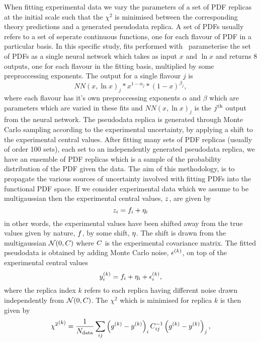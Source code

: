 When fitting experimental data we vary the parameters of a set of PDF replicas
at the initial scale such that the $\chi^2$ is minimised between the
corresponding theory predictions and a generated pseudodata replica. A set of
PDFs usually refers to a set of seperate continuous functions, one for each
flavour of PDF in a particular basis. In this specific study, fits performed
with \nfit\ parameterise the set of PDFs as a single neural network which takes
as input $x$ and $\ln x$ and returns 8 outputs, one for each flavour in the
fitting basis, multiplied by some preproccessing exponents. The output for a
single flavour $j$ is
\begin{equation}
    NN(x, \ln x)_j * x^{1-\alpha_j} * (1-x)^{\beta_j},
\end{equation}
where each flavour has it's own preproccessing exponents $\alpha$ and $\beta$
which are parameters which are varied in these fits and $NN(x, \ln x)_j$ is the
$j^{\rm th}$ output from the neural network. The pseudodata replica is generated
through Monte Carlo sampling according to the experimental uncertainty, by
applying a shift to the experimental
central values. After fitting many sets of PDF replicas (usually of order 100 sets),
each set to an independently generated pseudodata replica, we have an ensemble of
PDF replicas which is a sample of the probability distribution of the PDF given
the data. The aim of this methodology, is to propagate the various sources of
uncertainty involved with fitting PDFs into the functional PDF space. If we
consider experimental data which we assume
to be multigaussian then the experimental central values, $z$, are given by
\begin{equation}
    z_{i} = f_i + \eta_i
\end{equation}
in other words, the experimental values have been shifted away from the true
values given by nature, $f$, by some shift, $\eta$. The shift is drawn from
the multigaussian $\mathcal{N}(0, C)$ where $C$ is the experimental
covariance matrix. The fitted pseudodata is obtained by adding Monte Carlo
noise, $\epsilon^{(k)}$, on top of the experimental central values
\begin{equation}
    y^{(k)}_{i} = f_i + \eta_i + \epsilon^{(k)}_{i},
\end{equation}
where the replica index $k$ refers to each replica having different noise drawn
independently from $\mathcal{N}(0, C)$. The $\chi^2$ which is minimised for
replica $k$ is then given by
\begin{equation}
    {\chi^2}^{(k)} = \frac{1}{N_{\rm data}} \sum_{ij} \left( g^{(k)} - y^{(k)} \right)_i C^{-1}_{ij} \left( g^{(k)} - y^{(k)} \right)_j,
\end{equation}

